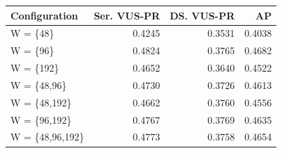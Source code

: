 \begin{tabular}{lrrr}
\toprule
Configuration & Ser. VUS-PR & DS. VUS-PR & AP \\
\midrule
W = \{48\} & 0.4245 & 0.3531 & 0.4038 \\
W = \{96\} & 0.4824 & 0.3765 & 0.4682 \\
W = \{192\} & 0.4652 & 0.3640 & 0.4522 \\
W = \{48,96\} & 0.4730 & 0.3726 & 0.4613 \\
W = \{48,192\} & 0.4662 & 0.3760 & 0.4556 \\
W = \{96,192\} & 0.4767 & 0.3769 & 0.4635 \\
W = \{48,96,192\} & 0.4773 & 0.3758 & 0.4654 \\
\bottomrule
\end{tabular}